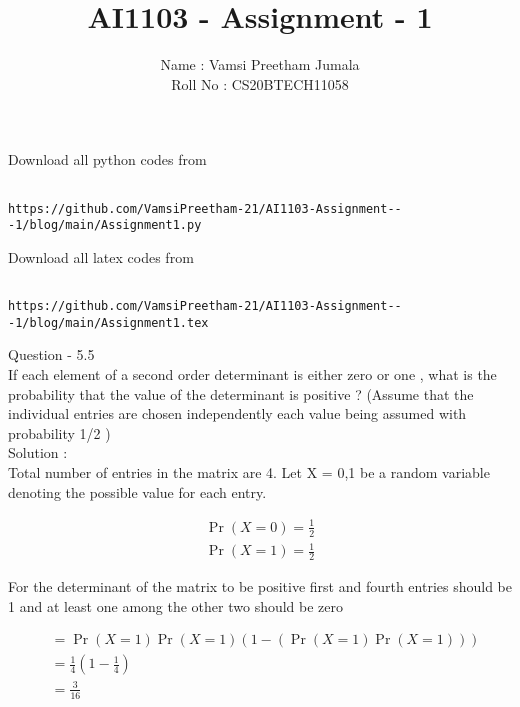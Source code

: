 \documentclass[journal,12pt,twocolumn]{IEEEtran}
\title{AI1103 - Assignment - 1}
\author{Name : Vamsi Preetham Jumala \\Roll No : CS20BTECH11058}
\begin{document}
\maketitle


Download all python codes from\\


\begin{lstlisting}

https://github.com/VamsiPreetham-21/AI1103-Assignment---1/blog/main/Assignment1.py

\end{lstlisting}


Download all latex codes from\\



\begin{lstlisting}

https://github.com/VamsiPreetham-21/AI1103-Assignment---1/blog/main/Assignment1.tex
\end{lstlisting}



Question - 5.5\\


If each element of a second order determinant is either zero or one , what is the probability that the value of the determinant is positive ? (Assume that the individual entries are chosen independently each value being assumed with probability 1/2 )\\


Solution :\\

Total number of entries in the matrix are 4.
Let X = {0,1} be a random variable denoting the possible value for each entry.

\begin{align}
    \Pr(X=0)=\frac{1}{2}\\
    \Pr(X=1)=\frac{1}{2}
\end{align}


For the determinant of the matrix to be positive first and fourth entries should be 1 and at least one among the other two should be zero

\begin{align}
     &=\Pr(X=1)\Pr(X=1)(1-(\Pr(X=1)\Pr(X=1)))\\
     &=\frac{1}{4}(1-\frac{1}{4})\\
     &=\frac{3}{16}
\end{align}
\end{document}
